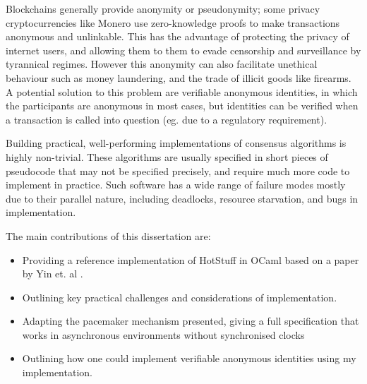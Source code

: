 Blockchains generally provide anonymity or pseudonymity; some privacy cryptocurrencies like Monero use zero-knowledge proofs to make transactions anonymous and unlinkable. This has the advantage of protecting the privacy of internet users, and allowing them to them to evade censorship and surveillance by tyrannical regimes. However this anonymity can also facilitate unethical behaviour such as money laundering, and the trade of illicit goods like firearms. A potential solution to this problem are verifiable anonymous identities, in which the participants are anonymous in most cases, but identities can be verified when a transaction is called into question (eg. due to a regulatory requirement).

Building practical, well-performing implementations of consensus algorithms is highly non-trivial. These algorithms are usually specified in short pieces of pseudocode that may not be specified precisely, and require much more code to implement in practice. Such software has a wide range of failure modes mostly due to their parallel nature, including deadlocks, resource starvation, and bugs in implementation. \cite{chubby}

The main contributions of this dissertation are:
\begin{itemize}
	\item Providing a reference implementation of HotStuff in OCaml based on a paper by Yin et. al \cite{yin2019hotstuff}.
	\item Outlining key practical challenges and considerations of implementation.
	\item Adapting the pacemaker mechanism presented, giving a full specification that works in asynchronous environments without synchronised clocks
	\item Outlining how one could implement verifiable anonymous identities \cite{hardjono2019verifiable} using my implementation.
\end{itemize}

